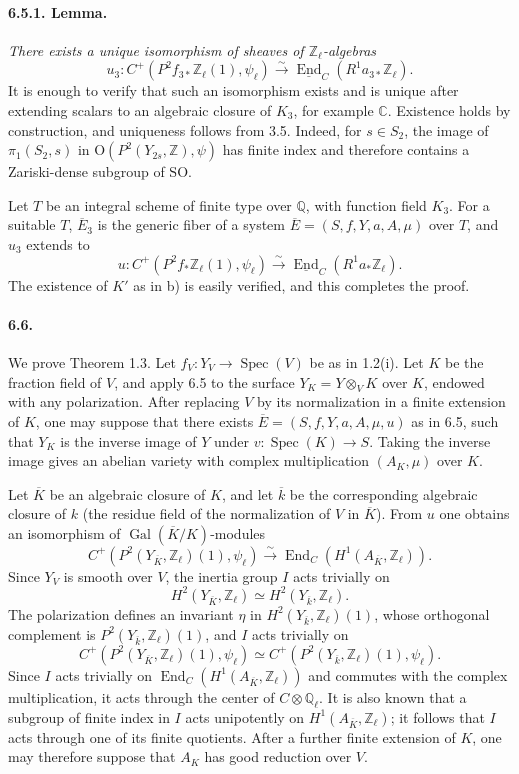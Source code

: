 \documentclass[10pt,leqno]{article}
\newcommand{\C}{\mathbb{C}}
\newcommand{\Q}{\mathbb{Q}}
\newcommand{\Z}{\mathbb{Z}}
\newcommand{\Gal}{\operatorname{Gal}}
\newcommand{\Spec}{\operatorname{Spec}}
\newcommand{\End}{\operatorname{End}}
\newcommand{\iso}{\xrightarrow{\sim}}
\begin{document}
\clearpage

\paragraph{6.5.1. Lemma.} \emph{There exists a unique isomorphism of sheaves of $\Z_\ell$-algebras}
\[
u_3:C^+(P^2f_{3*}\Z_\ell(1),\psi_\ell)\iso
\underline{\End}_C(R^1a_{3*}\Z_\ell).
\]
It is enough to verify that such an isomorphism exists and is unique after extending scalars to an algebraic closure of $K_3$, for example $\C$. Existence holds by construction, and uniqueness follows from 3.5. Indeed, for $s\in S_2$, the image of $\pi_1(S_2,s)$ in $\mathrm O(P^2(Y_{2s},\Z),\psi)$ has finite index and therefore contains a Zariski-dense subgroup of $\mathrm{SO}$.

Let $T$ be an integral scheme of finite type over $\Q$, with function field $K_3$. For a suitable $T$, $\overline E_3$ is the generic fiber of a system $\overline E=(S,f,Y,a,A,\mu)$ over $T$, and $u_3$ extends to
\[
u:C^+(P^2f_*\Z_\ell(1),\psi_\ell)\iso
\underline{\End}_C(R^1a_*\Z_\ell).
\]
The existence of $K'$ as in b) is easily verified, and this completes the proof.

\paragraph{6.6.} We prove Theorem 1.3. Let $f_V:Y_V\to\Spec(V)$ be as in 1.2(i). Let $K$ be the fraction field of $V$, and apply 6.5 to the surface $Y_K=Y\otimes_V K$ over $K$, endowed with any polarization. After replacing $V$ by its normalization in a finite extension of $K$, one may suppose that there exists $\overline E=(S,f,Y,a,A,\mu,u)$ as in 6.5, such that $Y_K$ is the inverse image of $Y$ under $v:\Spec(K)\to S$. Taking the inverse image gives an abelian variety with complex multiplication $(A_K,\mu)$ over $K$.

Let $\overline K$ be an algebraic closure of $K$, and let $\overline k$ be the corresponding algebraic closure of $k$ (the residue field of the normalization of $V$ in $\overline K$). From $u$ one obtains an isomorphism of $\Gal(\overline K/K)$-modules
\[
\tag{6.6.1}
C^+(P^2(Y_{\overline K},\Z_\ell)(1),\psi_\ell)\iso
\End_C(H^1(A_{\overline K},\Z_\ell)).
\]
Since $Y_V$ is smooth over $V$, the inertia group $I$ acts trivially on
\[
H^2(Y_{\overline K},\Z_\ell)\simeq H^2(Y_{\overline k},\Z_\ell).
\]
The polarization defines an invariant $\eta$ in $H^2(Y_{\overline k},\Z_\ell)(1)$, whose orthogonal complement is $P^2(Y_{\overline k},\Z_\ell)(1)$, and $I$ acts trivially on
\[
C^+(P^2(Y_{\overline K},\Z_\ell)(1),\psi_\ell)\simeq
C^+(P^2(Y_{\overline k},\Z_\ell)(1),\psi_\ell).
\]
Since $I$ acts trivially on $\End_C(H^1(A_{\overline K},\Z_\ell))$ and commutes with the complex multiplication, it acts through the center of $C\otimes\Q_\ell$. It is also known that a subgroup of finite index in $I$ acts unipotently on $H^1(A_{\overline K},\Z_\ell)$; it follows that $I$ acts through one of its finite quotients. After a further finite extension of $K$, one may therefore suppose that $A_K$ has good reduction over $V$.
\end{document}
